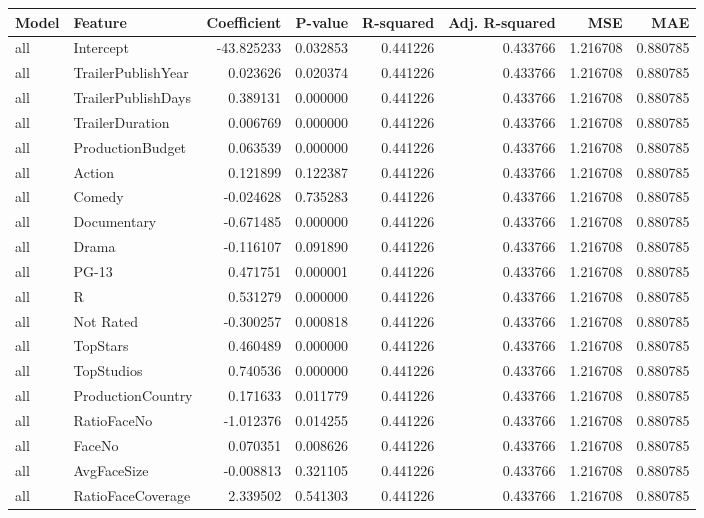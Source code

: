 \begin{tabular}{llrrrrrr}
\toprule
Model & Feature & Coefficient & P-value & R-squared & Adj. R-squared & MSE & MAE \\
\midrule
all & Intercept & -43.825233 & 0.032853 & 0.441226 & 0.433766 & 1.216708 & 0.880785 \\
all & TrailerPublishYear & 0.023626 & 0.020374 & 0.441226 & 0.433766 & 1.216708 & 0.880785 \\
all & TrailerPublishDays & 0.389131 & 0.000000 & 0.441226 & 0.433766 & 1.216708 & 0.880785 \\
all & TrailerDuration & 0.006769 & 0.000000 & 0.441226 & 0.433766 & 1.216708 & 0.880785 \\
all & ProductionBudget & 0.063539 & 0.000000 & 0.441226 & 0.433766 & 1.216708 & 0.880785 \\
all & Action & 0.121899 & 0.122387 & 0.441226 & 0.433766 & 1.216708 & 0.880785 \\
all & Comedy & -0.024628 & 0.735283 & 0.441226 & 0.433766 & 1.216708 & 0.880785 \\
all & Documentary & -0.671485 & 0.000000 & 0.441226 & 0.433766 & 1.216708 & 0.880785 \\
all & Drama & -0.116107 & 0.091890 & 0.441226 & 0.433766 & 1.216708 & 0.880785 \\
all & PG-13 & 0.471751 & 0.000001 & 0.441226 & 0.433766 & 1.216708 & 0.880785 \\
all & R & 0.531279 & 0.000000 & 0.441226 & 0.433766 & 1.216708 & 0.880785 \\
all & Not Rated & -0.300257 & 0.000818 & 0.441226 & 0.433766 & 1.216708 & 0.880785 \\
all & TopStars & 0.460489 & 0.000000 & 0.441226 & 0.433766 & 1.216708 & 0.880785 \\
all & TopStudios & 0.740536 & 0.000000 & 0.441226 & 0.433766 & 1.216708 & 0.880785 \\
all & ProductionCountry & 0.171633 & 0.011779 & 0.441226 & 0.433766 & 1.216708 & 0.880785 \\
all & RatioFaceNo & -1.012376 & 0.014255 & 0.441226 & 0.433766 & 1.216708 & 0.880785 \\
all & FaceNo & 0.070351 & 0.008626 & 0.441226 & 0.433766 & 1.216708 & 0.880785 \\
all & AvgFaceSize & -0.008813 & 0.321105 & 0.441226 & 0.433766 & 1.216708 & 0.880785 \\
all & RatioFaceCoverage & 2.339502 & 0.541303 & 0.441226 & 0.433766 & 1.216708 & 0.880785 \\

\end{tabular}
